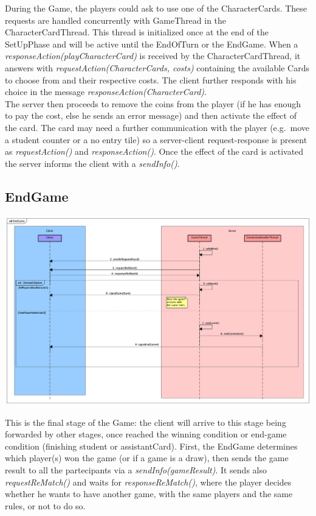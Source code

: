 \documentclass[12pt]{article}
\begin{document}
			During the Game, the players could ask to use one of the CharacterCards. These requests are handled concurrently with GameThread in the CharacterCardThread. This thread is initialized once at the end of the SetUpPhase and will be active until the EndOfTurn or the EndGame. When a \emph{responseAction(playCharacterCard)} is received by the CharacterCardThread, it answers with \emph{requestAction(CharacterCards, costs)} containing the available Cards to choose from and their respective costs. The client further responds with his choice in the message \emph{responseAction(CharacterCard)}. \\
			The server then proceeds to remove the coins from the player (if he has enough to pay the cost, else he sends an error message) and then activate the effect of the card. The card may need a further communication with the player (e.g.\ move a student counter or a no entry tile) so a server-client request-response is present as \emph{requestAction()} and \emph{responseAction()}. Once the effect of the card is activated the server informs the client with a \emph{sendInfo()}.
			
		\subsection{EndGame}
			
			\begin{center}
				\includegraphics[width=\textwidth,height=\textheight,keepaspectratio]{EndGame}
			\end{center}	
			
			This is the final stage of the Game: the client will arrive to this stage being forwarded by other stages, once reached the winning condition or end-game condition (finishing student or assistantCard). First, the EndGame determines which player(s) won the game (or if a game is a draw), then sends the game result to all the partecipants via a \emph{sendInfo(gameResult)}. It sends also \emph{requestReMatch()} and waits for \emph{responseReMatch()}, where the player decides whether he wants to have another game, with the same players and the same rules, or not to do so.
			
\end{document}
